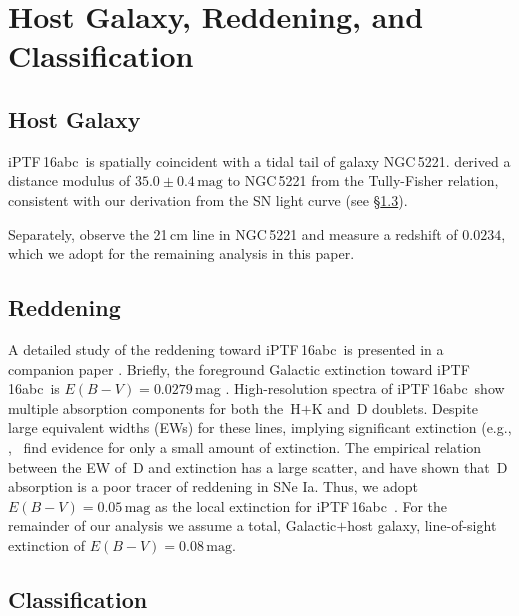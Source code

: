 \documentclass[twocolumn]{aastex61}
\newcommand{\abc}{iPTF\,16abc}
\begin{document}
\section{Host Galaxy, Reddening, and Classification}
\label{sec:usual_staff}

\subsection{Host Galaxy}
\label{sec:host}

\abc\ is spatially coincident with a tidal tail of galaxy NGC\,5221.
\citet{2007A&A...465...71T} derived a distance modulus of
$35.0\pm0.4\,\textrm{mag}$ to NGC\,5221 from the Tully-Fisher relation,
consistent with our derivation from the SN light curve (see
\S\ref{sec:classification}).

Separately, \citet{2015MNRAS.447.1531C} observe the 21\,cm line in NGC\,5221
and measure a redshift of $0.0234$, which we adopt for the remaining
analysis in this paper.

\subsection{Reddening}
\label{sec:reddening}

A detailed study of the reddening toward \abc\ is presented in a companion
paper \citep{2017A&A...606A.111F}. Briefly, the foreground Galactic
extinction toward \abc\ is $E(B-V) = 0.0279$\,mag
\citep{2011ApJ...737..103S}. High-resolution spectra of \abc\ show multiple
absorption components for both the \,H$+$K and \,D
doublets. Despite large equivalent widths (EWs) for these lines, implying
significant extinction (e.g., \citealt{2012MNRAS.426.1465P},
\citeauthor{2017A&A...606A.111F}~find evidence for only a small amount of
extinction. The empirical relation between the EW of \,D and
extinction has a large scatter, and \citet{2013ApJ...779...38P} have shown
that \,D absorption is a poor tracer of reddening in SNe Ia.
Thus, we adopt $E(B-V) = 0.05 \, \mathrm{mag}$ as the local extinction for
\abc\ \citep{2017A&A...606A.111F}. For the remainder of our analysis we
assume a total, Galactic$+$host galaxy, line-of-sight extinction of $E(B-V)
= 0.08 \, \mathrm{mag}$.

\subsection{Classification}
\label{sec:classification}
\end{document}
